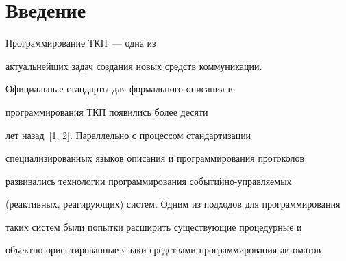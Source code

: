        















      \thispagestyle{headings}





      


            \label{st\stat}


                        


            


  \vspace*{-12pt}


      





\section{Введение}


      


      Программирование ТКП~--- одна из 


актуальнейших задач создания новых средств коммуникации.


      


      Официальные стандарты для формального описания и 


программирования ТКП появились более десяти 


лет назад~[1, 2]. Параллельно с процессом стандартизации 


специализированных языков описания и программирования протоколов 


развивались технологии программирования со\-бы\-тий\-но-управ\-ля\-емых 


(реактивных, реагирующих) систем. Одним из подходов для программирования 


таких систем были попытки расширить существующие процедурные и 


объектно-ориентированные языки средствами программирования автоматов 


